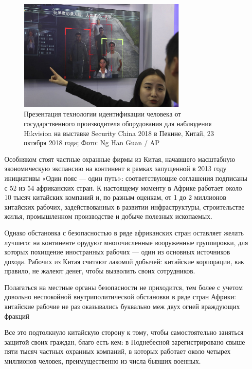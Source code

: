\begin{figure}[h]
    \centering
    \includegraphics[width=0.75\textwidth]{img/pmc_africa_5.jpg}
    \caption{Презентация технологии идентификации человека от государственного производителя оборудования для наблюдения Hikvision на выставке Security China 2018 в Пекине, Китай, 23 октября 2018 года; Фото: Ng Han Guan / AP}
\end{figure}

Особняком стоят частные охранные фирмы из Китая, начавшего масштабную экономическую экспансию на континент в рамках запущенной в 2013 году инициативы «Один пояс — один путь»: соответствующие соглашения подписаны с 52 из 54 африканских стран. К настоящему моменту в Африке работает около 10 тысяч китайских компаний и, по разным оценкам, от 1 до 2 миллионов китайских рабочих, задействованных в развитии инфраструктуры, строительстве жилья, промышленном производстве и добыче полезных ископаемых.

Однако обстановка с безопасностью в ряде африканских стран оставляет желать лучшего: на континенте орудуют многочисленные вооруженные группировки, для которых похищение иностранных рабочих — один из основных источников дохода. Рабочих из Китая считают лакомой добычей: китайские корпорации, как правило, не жалеют денег, чтобы вызволить своих сотрудников.

\begin{center}
    \Large
    Полагаться на местные органы безопасности не приходится, тем более с учетом довольно неспокойной внутриполитической обстановки в ряде стран Африки: китайские рабочие не раз оказывались буквально меж двух огней враждующих фракций
\end{center}

Все это подтолкнуло китайскую сторону к тому, чтобы самостоятельно заняться защитой своих граждан, благо есть кем: в Поднебесной зарегистрировано свыше пяти тысяч частных охранных компаний, в которых работает около четырех миллионов человек, преимущественно из числа бывших военных.

